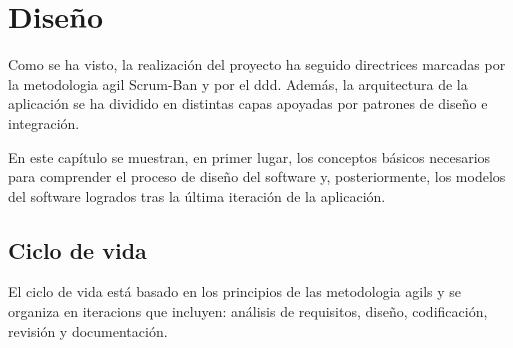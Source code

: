 \chapter[Analisis]{
  \label{chp:analisis}
  Diseño
}
\minitoc
\newpage

Como se ha visto, la realización del proyecto ha seguido directrices marcadas
por la \gls{metodologia agil} \gls{Scrum-Ban} y por el \gls{ddd}. Además,
la arquitectura de la aplicación se ha dividido en distintas capas apoyadas por
patrones de diseño e integración.

En este capítulo se muestran, en primer lugar, los conceptos básicos necesarios
para comprender el proceso de diseño del software y, posteriormente, los modelos
del software logrados tras la última iteración de la aplicación.


\section{Ciclo de vida}

El ciclo de vida está basado en los principios de las \glspl{metodologia agil} y
se organiza en \glspl{iteracion} que incluyen: análisis de requisitos,
diseño, codificación, revisión y documentación.